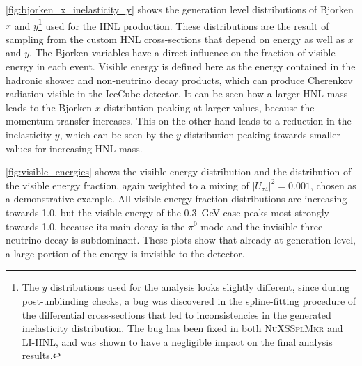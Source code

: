 \documentclass[
    aps,
    prd,
    reprint,
    amsmath,
    amssymb,
    nofootinbib,
    superscriptaddress,
    floatfix
]{revtex4-2}
\newcommand{\gev}{\giga\electronvolt}
\def\nomathut4{|U_{\tau4}|^2}
\begin{document}
\cref{fig:bjorken_x_inelasticity_y} shows the generation level distributions of Bjorken $x$ and $y$\footnote{The $y$ distributions used for the analysis looks slightly different, since during post-unblinding checks, a bug was discovered in the spline-fitting procedure of the differential cross-sections that led to inconsistencies in the generated inelasticity distribution. The bug has been fixed in both \textsc{NuXSSplMkr} and LI-HNL, and was shown to have a negligible impact on the final analysis results.} used for the HNL production. These distributions are the result of sampling from the custom HNL cross-sections that depend on energy as well as $x$ and $y$. The Bjorken variables have a direct influence on the fraction of visible energy in each event. Visible energy is defined here as the energy contained in the hadronic shower and non-neutrino decay products, which can produce Cherenkov radiation visible in the IceCube detector.
It can be seen how a larger HNL mass leads to the Bjorken $x$ distribution peaking at larger values, because the momentum transfer increases. This on the other hand leads to a reduction in the inelasticity $y$, which can be seen by the $y$ distribution peaking towards smaller values for increasing HNL mass.

\cref{fig:visible_energies} shows the visible energy distribution and the distribution of the visible energy fraction, again weighted to a mixing of $\nomathut4 = 0.001$, chosen as a demonstrative example.
All visible energy fraction distributions are increasing towards 1.0, but the visible energy of the \SI{0.3}{\gev} case peaks most strongly towards 1.0, because its main decay is the $\pi^0$ mode and the invisible three-neutrino decay is subdominant. These plots show that already at generation level, a large portion of the energy is invisible to the detector.

\end{document}
